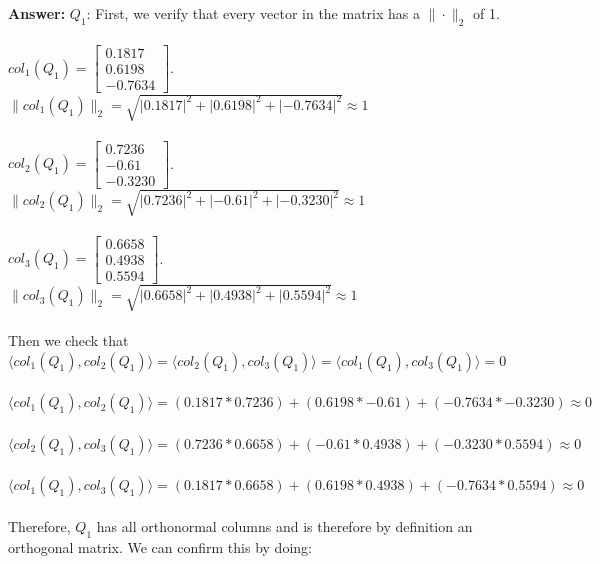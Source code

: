 \documentclass[12pt]{article}
\begin{document}
\bigskip
\noindent\textbf{Answer:} $Q_1$: First, we verify that every vector in the matrix has a $\|\cdot\|_2$ of 1.
\\~\\$col_1\left(Q_1\right)=\left[\begin{array}{c}{0.1817} \\ {0.6198} \\ {-0.7634}\end{array}\right]$. $\|col_1\left(Q_1\right)\|_2=\sqrt{|0.1817|^2+|0.6198|^2+|-0.7634|^2}\approx 1$
\\~\\$col_2\left(Q_1\right)=\left[\begin{array}{c}{0.7236} \\ {-0.61} \\ {-0.3230}\end{array}\right]$. $\|col_2\left(Q_1\right)\|_2=\sqrt{|0.7236|^2+|-0.61|^2+|-0.3230|^2}\approx 1$
\\~\\$col_3\left(Q_1\right)=\left[\begin{array}{c}{0.6658} \\ {0.4938} \\ {0.5594}\end{array}\right]$. $\|col_3\left(Q_1\right)\|_2=\sqrt{|0.6658|^2+|0.4938|^2+|0.5594|^2}\approx 1$
\\~\\Then we check that $\langle col_1\left(Q_1\right), col_2\left(Q_1\right)\rangle=\langle col_2\left(Q_1\right), col_3\left(Q_1\right)\rangle=\langle col_1\left(Q_1\right), col_3\left(Q_1\right)\rangle=0$
\\~\\$\langle col_1\left(Q_1\right), col_2\left(Q_1\right)\rangle=(0.1817*0.7236)+(0.6198*-0.61)+(-0.7634*-0.3230)\approx 0$
\\~\\$\langle col_2\left(Q_1\right), col_3\left(Q_1\right)\rangle=(0.7236*0.6658)+(-0.61*0.4938)+(-0.3230*0.5594)\approx 0$
\\~\\$\langle col_1\left(Q_1\right), col_3\left(Q_1\right)\rangle=(0.1817*0.6658)+(0.6198*0.4938)+(-0.7634*0.5594)\approx 0$
\\~\\Therefore, $Q_1$ has all orthonormal columns and is therefore by definition an orthogonal matrix. We can confirm this by doing: 
\end{document}
